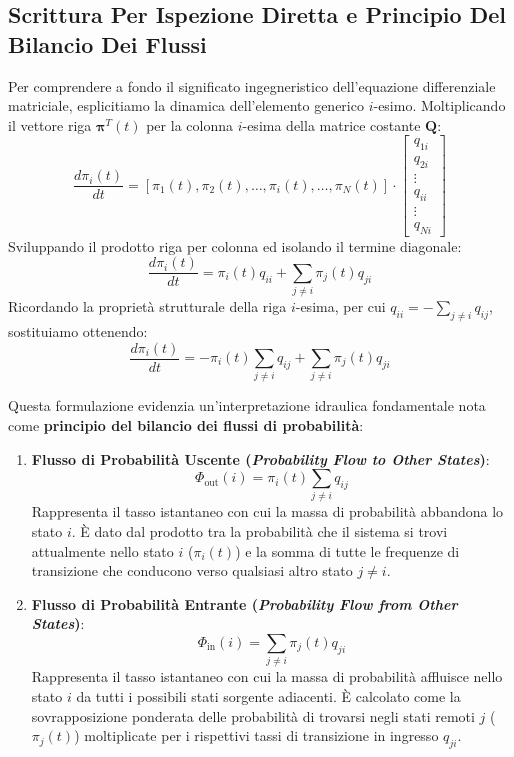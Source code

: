 \documentclass[11pt, a4paper]{article}
\begin{document}
\subsection{Scrittura Per Ispezione Diretta e Principio Del Bilancio Dei Flussi}

Per comprendere a fondo il significato ingegneristico dell'equazione differenziale matriciale, esplicitiamo la dinamica dell'elemento generico $i$-esimo. Moltiplicando il vettore riga $\bm{\pi}^T(t)$ per la colonna $i$-esima della matrice costante $\bm{Q}$:
\[
    \frac{d \pi_i(t)}{dt} = [\pi_1(t), \pi_2(t), \dots, \pi_i(t), \dots, \pi_N(t)] \cdot \begin{bmatrix} q_{1i} \\ q_{2i} \\ \vdots \\ q_{ii} \\ \vdots \\ q_{Ni} \end{bmatrix}
\]
Sviluppando il prodotto riga per colonna ed isolando il termine diagonale:
\[
    \frac{d \pi_i(t)}{dt} = \pi_i(t) q_{ii} + \sum_{j \neq i} \pi_j(t) q_{ji}
\]
Ricordando la proprietà strutturale della riga $i$-esima, per cui $q_{ii} = -\sum_{j \neq i} q_{ij}$, sostituiamo ottenendo:
\[
    \boxed{\frac{d \pi_i(t)}{dt} = -\pi_i(t) \sum_{j \neq i} q_{ij} + \sum_{j \neq i} \pi_j(t) q_{ji}}
\]


Questa formulazione evidenzia un'interpretazione idraulica fondamentale nota come \textbf{principio del bilancio dei flussi di probabilità}:
\begin{enumerate}
    \item \textbf{Flusso di Probabilità Uscente (\emph{Probability Flow to Other States})}:
    \[
        \Phi_{\text{out}}(i) = \pi_i(t) \sum_{j \neq i} q_{ij}
    \]
    Rappresenta il tasso istantaneo con cui la massa di probabilità abbandona lo stato $i$. È dato dal prodotto tra la probabilità che il sistema si trovi attualmente nello stato $i$ ($\pi_i(t)$) e la somma di tutte le frequenze di transizione che conducono verso qualsiasi altro stato $j \neq i$.

    \item \textbf{Flusso di Probabilità Entrante (\emph{Probability Flow from Other States})}:
    \[
        \Phi_{\text{in}}(i) = \sum_{j \neq i} \pi_j(t) q_{ji}
    \]
    Rappresenta il tasso istantaneo con cui la massa di probabilità affluisce nello stato $i$ da tutti i possibili stati sorgente adiacenti. È calcolato come la sovrapposizione ponderata delle probabilità di trovarsi negli stati remoti $j$ ($\pi_j(t)$) moltiplicate per i rispettivi tassi di transizione in ingresso $q_{ji}$.
\end{enumerate}
\end{document}
